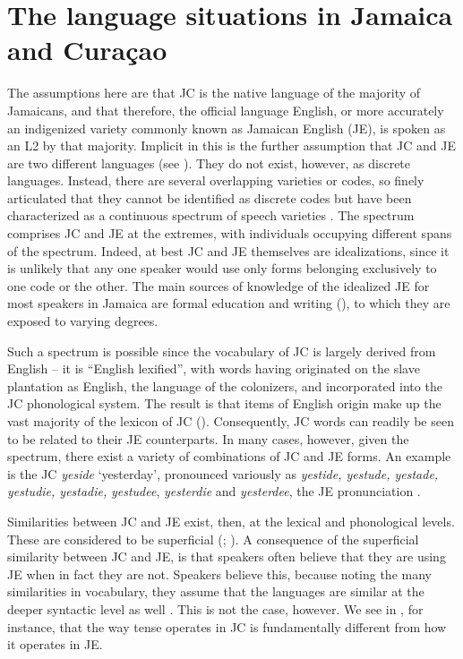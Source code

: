 \documentclass[output=paper,colorlinks,citecolor=brown]{langscibook}
\begin{document}
\section{The language situations in Jamaica and Curaçao} \label{sec:messamk:2}
The assumptions here are that JC is the native language of the majority of Jamaicans, and that therefore, the official language English, or more accurately an indigenized variety commonly known as Jamaican English (JE), is spoken as an L2 by that majority. Implicit in this is the further assumption that JC and JE are two different languages (see \citealt[10--13]{Kennedy2017}). They do not exist, however, as discrete languages. Instead, there are several overlapping varieties or codes, so finely articulated that they cannot be identified as discrete codes but have been characterized as a continuous spectrum of speech varieties \citep[350]{DeCamp1971toward}. The spectrum comprises JC and JE at the extremes, with individuals occupying different spans of the spectrum. Indeed, at best JC and JE themselves are idealizations, since it is unlikely that any one speaker would use only forms belonging exclusively to one code or the other. The main sources of knowledge of the idealized JE for most speakers in Jamaica are formal education and writing (\citealt[256]{DevonishHarry2008}), to which they are exposed to varying degrees.

Such a spectrum is possible since the vocabulary of JC is largely derived from English – it is “English lexified”, with words having originated on the slave plantation as English, the language of the colonizers, and incorporated into the JC phonological system. The result is that items of English origin make up the vast majority of the lexicon of JC (\citealt[256]{DevonishHarry2008}). Consequently, JC words can readily be seen to be related to their JE counterparts. In many cases, however, given the spectrum, there exist a variety of combinations of JC and JE forms. An example is the JC \textit{yeside} ‘yesterday’, pronounced variously as \textit{yestide, yestude, yestade, yestudie, yestadie,} \textit{yestudee}, \textit{yesterdie} and \textit{yesterdee}, the JE pronunciation \citep[60]{Kennedy2017}.

Similarities between JC and JE exist, then, at the lexical and phonological levels. These are considered to be superficial (\citealt{Craig1980}; \citealt{Kennedy2017}). A consequence of the superficial similarity between JC and JE, is that speakers often believe that they are using JE when in fact they are not. Speakers believe this, because noting the many similarities in vocabulary, they assume that the languages are similar at the deeper syntactic level as well \citep{Craig1980}. This is not the case, however. We see in , for instance, that the way tense operates in JC is fundamentally different from how it operates in JE.
\end{document}
